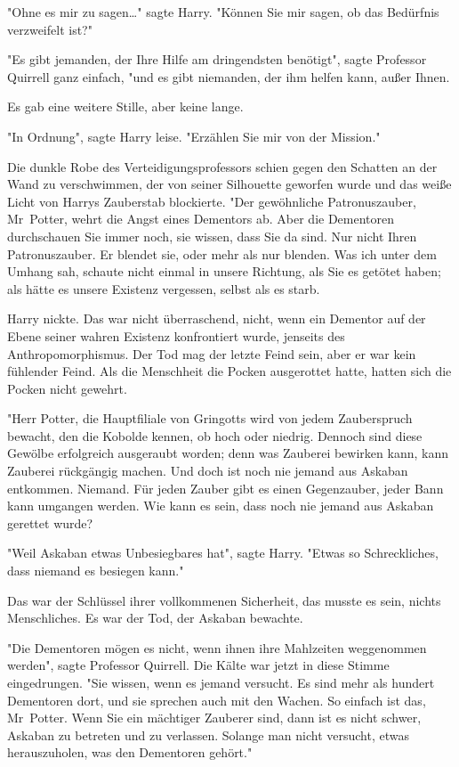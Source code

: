 {"Ohne es mir zu sagen…" sagte Harry. "Können Sie mir sagen, ob das Bedürfnis verzweifelt ist?"

"Es gibt jemanden, der Ihre Hilfe am dringendsten benötigt", sagte Professor Quirrell ganz einfach, "und es gibt niemanden, der ihm helfen kann, außer Ihnen.

Es gab eine weitere Stille, aber keine lange.

"In Ordnung", sagte Harry leise. "Erzählen Sie mir von der Mission."

Die dunkle Robe des Verteidigungsprofessors schien gegen den Schatten an der Wand zu verschwimmen, der von seiner Silhouette geworfen wurde und das weiße Licht von Harrys Zauberstab blockierte. "Der gewöhnliche Patronuszauber, Mr~Potter, wehrt die Angst eines Dementors ab. Aber die Dementoren durchschauen Sie immer noch, sie wissen, dass Sie da sind. Nur nicht Ihren Patronuszauber. Er blendet sie, oder mehr als nur blenden. Was ich unter dem Umhang sah, schaute nicht einmal in unsere Richtung, als Sie es getötet haben; als hätte es unsere Existenz vergessen, selbst als es starb.

Harry nickte. Das war nicht überraschend, nicht, wenn ein Dementor auf der Ebene seiner wahren Existenz konfrontiert wurde, jenseits des Anthropomorphismus. Der Tod mag der letzte Feind sein, aber er war kein fühlender Feind. Als die Menschheit die Pocken ausgerottet hatte, hatten sich die Pocken nicht gewehrt.

"Herr Potter, die Hauptfiliale von Gringotts wird von jedem Zauberspruch bewacht, den die Kobolde kennen, ob hoch oder niedrig. Dennoch sind diese Gewölbe erfolgreich ausgeraubt worden; denn was Zauberei bewirken kann, kann Zauberei rückgängig machen. Und doch ist noch nie jemand aus Askaban entkommen. Niemand. Für jeden Zauber gibt es einen Gegenzauber, jeder Bann kann umgangen werden. Wie kann es sein, dass noch nie jemand aus Askaban gerettet wurde?

"Weil Askaban etwas Unbesiegbares hat", sagte Harry. "Etwas so Schreckliches, dass niemand es besiegen kann."

Das war der Schlüssel ihrer vollkommenen Sicherheit, das musste es sein, nichts Menschliches. Es war der Tod, der Askaban bewachte.

"Die Dementoren mögen es nicht, wenn ihnen ihre Mahlzeiten weggenommen werden", sagte Professor Quirrell. Die Kälte war jetzt in diese Stimme eingedrungen. "Sie wissen, wenn es jemand versucht. Es sind mehr als hundert Dementoren dort, und sie sprechen auch mit den Wachen. So einfach ist das, Mr~Potter. Wenn Sie ein mächtiger Zauberer sind, dann ist es nicht schwer, Askaban zu betreten und zu verlassen. Solange man nicht versucht, etwas herauszuholen, was den Dementoren gehört."

}
